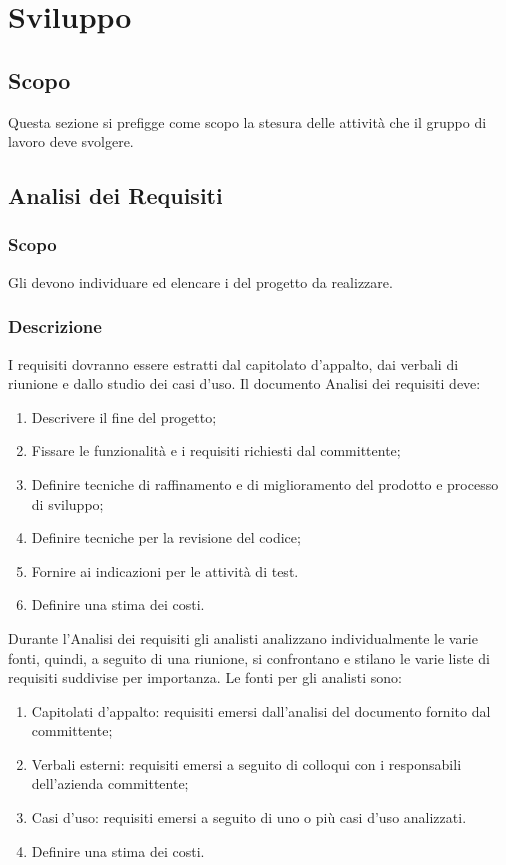 \documentclass[../NomeDocumento.tex]{subfiles}
\begin{document}
	
\section{Sviluppo}
\subsection{Scopo}
Questa sezione si prefigge come scopo la stesura delle attività che il gruppo di lavoro deve svolgere.
\subsection{Analisi dei Requisiti}

	\subsubsection{Scopo} Gli  devono individuare ed elencare i  del progetto da realizzare.
	\subsubsection{Descrizione}
	I requisiti dovranno essere estratti dal capitolato d’appalto, dai verbali di riunione e dallo studio dei casi d’uso. 
	Il documento Analisi dei requisiti deve:
	\begin{enumerate}
		\item Descrivere il fine del progetto;
		\item Fissare le funzionalità e i requisiti richiesti dal committente;
		\item Definire tecniche di raffinamento e di miglioramento del prodotto e processo di sviluppo;
		\item Definire tecniche per la revisione del codice;
		\item Fornire ai  indicazioni per le attività di test.
		\item Definire una stima dei costi.
	\end{enumerate}
	 Durante l’Analisi dei requisiti gli analisti analizzano individualmente le varie fonti, quindi, a seguito di una riunione, si confrontano e stilano le varie liste di requisiti suddivise per importanza. Le fonti per gli analisti sono:
	\begin{enumerate}
		\item Capitolati d’appalto: requisiti emersi dall’analisi del documento fornito dal committente;
		\item Verbali esterni: requisiti emersi a seguito di colloqui con i responsabili dell’azienda committente;
		\item Casi d'uso: requisiti emersi a seguito di uno o più casi d’uso analizzati.
		\item Definire una stima dei costi.
	\end{enumerate}
\end{document}
